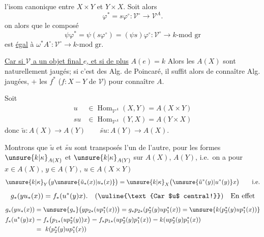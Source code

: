  l'isom canonique entre $X\times Y$ et $Y\times X$. Soit alors
\[
\varphi^*=s\varphi^\circ:\mathcal V^\circ\longrightarrow\mathcal V^A.
\]
on  alors que le composé
\[
\psi\varphi^*=\psi(s\varphi^\circ)=(\psi s)\varphi^\circ:\mathcal V^\circ\longrightarrow k\text{-mod gr}
\]
est  \uline{égal} à $\omega^*A^\circ:\mathcal V^\circ\longrightarrow k\text{-mod gr}$.


\uline{Car si $\mathcal V$ a un objet final $e$, et si de plus} $A(e)=k$  Alors les $A(X)$ sont naturellement jaugés; si c'est des Alg. de Poincaré, il suffit alors de connaître  Alg. jaugées, $+$ les $f^*$ ($f:X-Y$ de $\mathcal V$) pour connaître $A$.

Soit
\[
\begin{aligned}
u&\in\operatorname{Hom}_{\mathcal V^A}(X,Y)=A(X\times Y)\\
su&\in\operatorname{Hom}_{\mathcal V^A}(Y,X)=A(Y\times X)
\end{aligned}
\]
donc $\tilde u:A(X)\longrightarrow A(Y)\qquad\widetilde{su}:A(Y)\longrightarrow A(X)$.

Montrons que  $\tilde u$ et $\widetilde{su}$ sont transposés l'un de l'autre, pour les formes $\unsure{k|\kappa}_{A(X)}$ et $\unsure{k|\kappa}_{A(Y)}$ sur $A(X)$, $A(Y)$, i.e.\ on a pour $x\in A(X)$, $y\in A(Y)$, $u\in A(X\times Y)$
\[
\unsure{k|\kappa}_Y\bigl(y\unsure{\tilde u_*(x)|u_*(x)}\bigr)=\unsure{k|\kappa}_X\bigl(\unsure{\tilde u^*(y)|u^*(y)}x\bigr)\qquad\text{i.e.}
\]
\[
g_*(y u_*(x))=f_*(u^*(y)x).\quad(\uuline{\text{Car $u$ central!}})\quad\text{En effet}
\]
\[
\begin{aligned}
g_*(y u_*(x))
&=\unsure{g_*}\bigl(y p_{2*}(u p_1^*(x))\bigr)
=g_*p_{2*}(p_2^*(y)u p_1^*(x))
=\unsure{k(p_2^*(y)u p_1^*(x))}\\
f_*(u^*(y)x)
&=f_*\bigl(p_{1*}(u p_2^*(y))x\bigr)
=f_*p_{1*}(u p_2^*(y)p_1^*(x))
=k(u p_2^*(y)p_1^*(x))\\
&=\ k(p_2^*(y)u p_1^*(x))
\end{aligned}
\]
